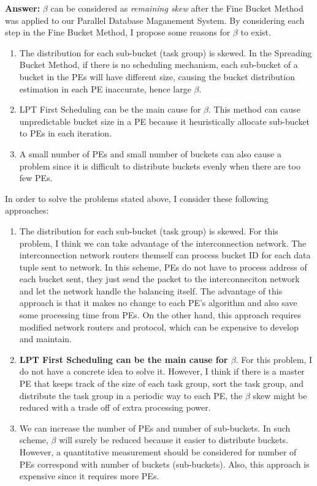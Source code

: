 \documentclass[a4paper,12pt]{article}
\begin{document}
\vspace{1.5em}
\noindent
\textbf{Answer:} 
\noindent
$\beta$ can be considered as \emph{remaining skew} after the Fine Bucket Method was applied to our Parallel Database Maganement System. By considering each step in the Fine Bucket Method, I propose some reasons for $\beta$ to exist.
\begin{enumerate}
	\item The distribution for each sub-bucket (task group) is skewed. In the Spreading Bucket Method, if there is no scheduling mechanism, each sub-bucket of a bucket in the PEs will have different size, causing the bucket distribution estimation in each PE inaccurate, hence large $\beta$.
	\item LPT First Scheduling can be the main cause for $\beta$. This method can cause unpredictable bucket size in a PE because it heuristically allocate sub-bucket to PEs in each iteration.
	\item A small number of PEs and small number of buckets can also cause a problem since it is difficult to distribute buckets evenly when there are too few PEs.
\end{enumerate}
In order to solve the problems stated above, I consider these following approaches:
\begin{enumerate}
	\item The distribution for each sub-bucket (task group) is skewed. For this problem, I think we can take advantage of the interconnection network. The interconnection network routers themself can process bucket ID for each data tuple sent to network. In this scheme, PEs do not have to process address of each bucket sent, they just send the packet to the interconneciton network and let the network handle the balancing itself. The advantage of this approach is that it makes no change to each PE's algorithm and also save some processing time from PEs. On the other hand, this approach requires modified network routers and protocol, which can be expensive to develop and maintain.
	\item \textbf{LPT First Scheduling can be the main cause for $\beta$}. For this problem, I do not have a concrete idea to solve it. However, I think if there is a master PE that keeps track of the size of each task group, sort the task group, and distribute the task group in a periodic way to each PE, the $\beta$ skew might be reduced with a trade off of extra processing power.
	\item We can increase the number of PEs and number of sub-buckets. In such scheme, $\beta$ will surely be reduced because it easier to distribute buckets. However, a quantitative measurement should be considered for number of PEs correspond with number of buckets (sub-buckets). Also, this approach is expensive since it requires more PEs.
\end{enumerate}
\end{document}
